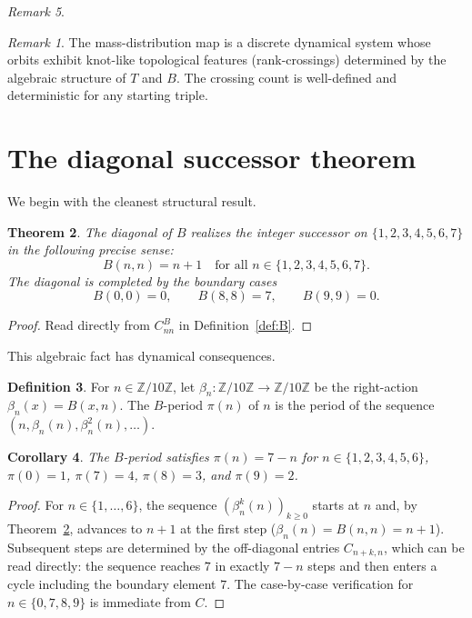 \documentclass[submission,copyright,creativecommons]{eptcs}
\theoremstyle{plain}
\newtheorem{theorem}{Theorem}
\newtheorem{corollary}[theorem]{Corollary}
\theoremstyle{definition}
\newtheorem{definition}[theorem]{Definition}
\theoremstyle{remark}
\newtheorem{remark}[theorem]{Remark}
\begin{document}
\begin{remark}
\begin{remark}
The mass-distribution map is a discrete dynamical system whose orbits
exhibit knot-like topological features (rank-crossings) determined by the
algebraic structure of $T$ and $B$. The crossing count is well-defined and
deterministic for any starting triple.
\end{remark}

\section{The diagonal successor theorem}\label{sec:diag}

We begin with the cleanest structural result.

\begin{theorem}\label{thm:diagonal}
The diagonal of $B$ realizes the integer successor on
$\{1, 2, 3, 4, 5, 6, 7\}$ in the following precise sense:
\[
B(n, n) = n + 1 \quad \text{for all } n \in \{1, 2, 3, 4, 5, 6, 7\}.
\]
The diagonal is completed by the boundary cases
\[
B(0, 0) = 0, \qquad B(8, 8) = 7, \qquad B(9, 9) = 0.
\]
\end{theorem}

\begin{proof}
Read directly from $C^B_{nn}$ in Definition~\ref{def:B}.
\end{proof}

This algebraic fact has dynamical consequences.

\begin{definition}
For $n \in \mathbb{Z}/10\mathbb{Z}$, let $\beta_n : \mathbb{Z}/10\mathbb{Z}
\to \mathbb{Z}/10\mathbb{Z}$ be the right-action $\beta_n(x) = B(x, n)$.
The $B$-period $\pi(n)$ of $n$ is the period of the sequence $(n,
\beta_n(n), \beta_n^2(n), \dots)$.
\end{definition}

\begin{corollary}\label{cor:period}
The $B$-period satisfies $\pi(n) = 7 - n$ for $n \in \{1, 2, 3, 4, 5, 6\}$,
$\pi(0) = 1$, $\pi(7) = 4$, $\pi(8) = 3$, and $\pi(9) = 2$.
\end{corollary}

\begin{proof}
For $n \in \{1, \dots, 6\}$, the sequence $(\beta_n^k(n))_{k \geq 0}$
starts at $n$ and, by Theorem~\ref{thm:diagonal}, advances to $n+1$ at the
first step ($\beta_n(n) = B(n, n) = n+1$). Subsequent steps are determined
by the off-diagonal entries $C_{n+k, n}$, which can be read directly: the
sequence reaches $7$ in exactly $7 - n$ steps and then enters a cycle
including the boundary element $7$. The case-by-case verification for
$n \in \{0, 7, 8, 9\}$ is immediate from $C$.
\end{proof}


\end{remark}
\end{document}

